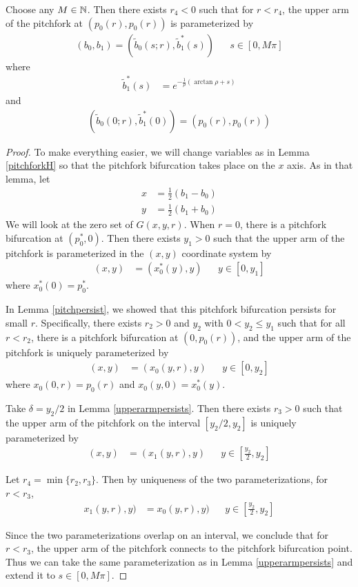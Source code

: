 \documentclass[thesis.tex]{subfiles}
\begin{document}
\begin{lemma}\label{pitchforkconnects}
Choose any $M \in {\mathbb N}$. Then there exists $r_4 < 0$ such that for $r < r_4$, the upper arm of the pitchfork at $(p_0(r), p_0(r))$ is parameterized by
\begin{align*}
(b_0, b_1) = (\tilde{b}_0(s; r), \tilde{b}^*_1(s)) && s \in [0, M \pi]
\end{align*}
where
\begin{align*}
\tilde{b}_1^*(s) &= e^{-\frac{1}{\rho}(\arctan \rho +s)} 
\end{align*}
and 
\begin{align*}
(\tilde{b}_0(0; r), \tilde{b}^*_1(0)) = (p_0(r), p_0(r))
\end{align*}

\begin{proof}
To make everything easier, we will change variables as in Lemma \ref{pitchforkH} so that the pitchfork bifurcation takes place on the $x$ axis. As in that lemma, let 
\begin{align*}
x &= \frac{1}{2}(b_1 - b_0) \\
y &= \frac{1}{2}(b_1 + b_0)
\end{align*}
We will look at the zero set of $G(x, y, r)$. When $r = 0$, there is a pitchfork bifurcation at $(p_0^*, 0)$. Then there exists $y_1 > 0$ such that the upper arm of the pitchfork is parameterized in the $(x,y)$ coordinate system by 
\begin{align*}
(x, y) &= (x_0^*(y), y) && y \in [0, y_1]
\end{align*}
where $x_0^*(0) = p_0^*$. 

In Lemma \ref{pitchpersist}, we showed that this pitchfork bifurcation persists for small $r$. Specifically, there exists $r_2 > 0$ and $y_2$ with $0 < y_2 \leq y_1$ such that for all $r < r_2$, there is a pitchfork bifurcation at $(0, p_0(r))$, and the upper arm of the pitchfork is uniquely parameterized by
\begin{align*}
(x, y) &= (x_0(y, r), y) && y \in [0, y_2]
\end{align*}
where $x_0(0, r) = p_0(r)$ and $x_0(y, 0) = x_0^*(y)$. 

Take $\delta = y_2/2$ in Lemma \ref{upperarmpersists}. Then there exists $r_3 > 0$ such that the upper arm of the pitchfork on the interval $[y_2/2, y_2]$ is uniquely parameterized by 
\begin{align*}
(x, y) &= (x_1(y, r), y) && y \in \left[\frac{y_2}{2}, y_2\right]
\end{align*}

Let $r_4 = \min\{ r_2, r_3 \}$. Then by uniqueness of the two parameterizations, for $r < r_3$,
\begin{align*}
x_1(y, r), y) &= x_0(y, r), y) && y \in \left[\frac{y_2}{2}, y_2\right]
\end{align*}

Since the two parameterizations overlap on an interval, we conclude that for $r < r_3$, the upper arm of the pitchfork connects to the pitchfork bifurcation point. Thus we can take the same parameterization as in Lemma \ref{upperarmpersists} and extend it to $s \in [0, M \pi]$.
\end{proof}
\end{lemma}
\end{document}
